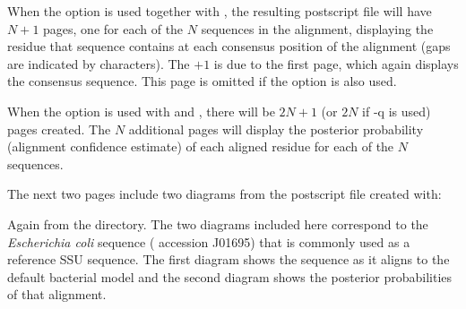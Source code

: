 When the  option is used together with , the
resulting postscript file will have $N+1$ pages, one for each of the
$N$ sequences in the alignment, displaying the residue that sequence
contains at each consensus position of the alignment (gaps are
indicated by \prog{-} characters). The $+1$ is due to the first page,
which again displays the consensus sequence. This page is omitted if
the  option is also used.

When the  option is used with  and
, there will be $2N+1$ (or $2N$ if {\prog -q} is used)
pages created. The $N$ additional pages will display the posterior
probability (alignment confidence estimate) of each aligned residue
for each of the $N$ sequences.

The next two pages include two diagrams from the postscript file 
 created with:


Again from the  directory.
The two diagrams included here correspond to the
\emph{Escherichia coli} sequence ( accession J01695) that
is commonly used as a reference SSU sequence. The first diagram shows
the sequence as it aligns to the default bacterial model and the
second diagram shows the posterior probabilities of that alignment.


